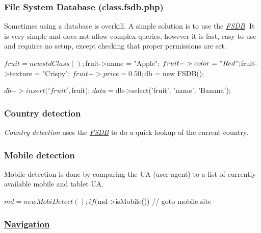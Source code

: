 \subsubsection*{File System Database (class.\-fsdb.\-php)}

Sometimes using a database is overkill. A simple solution is to use the {\itshape \hyperlink{class_f_s_d_b}{F\-S\-D\-B}}. It is very simple and does not allow complex queries, however it is fast, easy to use and requires no setup, except checking that proper permissions are set. \begin{DoxyVerb}$fruit = new stdClass();

$fruit->name = "Apple";
$fruit->color = "Red";
$fruit->texture = "Crispy";
$fruit->price = 0.50;

$db = new FSDB();

$db->insert('fruit', $fruit);
$data = $db->select('fruit', 'name', 'Banana');
\end{DoxyVerb}


\subsubsection*{Country detection}

{\itshape Country detection} uses the {\itshape \hyperlink{class_f_s_d_b}{F\-S\-D\-B}} to do a quick lookup of the current country. 


\subsubsection*{Mobile detection}

Mobile detection is done by comparing the U\-A (user-\/agent) to a list of currently available mobile and tablet U\-A. \begin{DoxyVerb}$md = new MobiDetect();

if ($md->isMobile()) {
    // goto mobile site
}
\end{DoxyVerb}


\subsubsection*{\hyperlink{class_navigation}{Navigation}}


